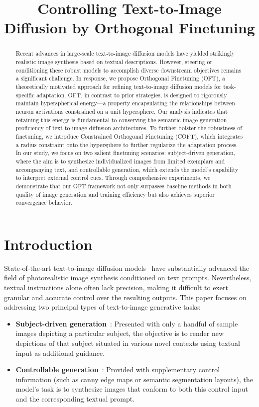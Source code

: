 \title{Controlling Text-to-Image Diffusion by Orthogonal Finetuning}

\begin{abstract}
Recent advances in large-scale text-to-image diffusion models have yielded strikingly realistic image synthesis based on textual descriptions. However, steering or conditioning these robust models to accomplish diverse downstream objectives remains a significant challenge. In response, we propose Orthogonal Finetuning (OFT), a theoretically motivated approach for refining text-to-image diffusion models for task-specific adaptation. OFT, in contrast to prior strategies, is designed to rigorously maintain hyperspherical energy—a property encapsulating the relationships between neuron activations constrained on a unit hypersphere. Our analysis indicates that retaining this energy is fundamental to conserving the semantic image generation proficiency of text-to-image diffusion architectures. To further bolster the robustness of finetuning, we introduce Constrained Orthogonal Finetuning (COFT), which integrates a radius constraint onto the hypersphere to further regularize the adaptation process. In our study, we focus on two salient finetuning scenarios: subject-driven generation, where the aim is to synthesize individualized images from limited exemplars and accompanying text, and controllable generation, which extends the model’s capability to interpret external control cues. Through comprehensive experiments, we demonstrate that our OFT framework not only surpasses baseline methods in both quality of image generation and training efficiency but also achieves superior convergence behavior.
\end{abstract}

\section{Introduction}

State-of-the-art text-to-image diffusion models~\cite{saharia2022photorealistic,ramesh2022hierarchical,rombach2022high} have substantially advanced the field of photorealistic image synthesis conditioned on text prompts. Nevertheless, textual instructions alone often lack precision, making it difficult to exert granular and accurate control over the resulting outputs. This paper focuses on addressing two principal types of text-to-image generative tasks:

\begin{itemize}[leftmargin=*,nosep]

    \item \textbf{Subject-driven generation}~\cite{ruiz2023dreambooth}: Presented with only a handful of sample images depicting a particular subject, the objective is to render new depictions of that subject situated in various novel contexts using textual input as additional guidance.
    \item \textbf{Controllable generation}~\cite{zhang2023adding,mou2023t2i}: Provided with supplementary control information (such as canny edge maps or semantic segmentation layouts), the model’s task is to synthesize images that conform to both this control input and the corresponding textual prompt.
\end{itemize}

